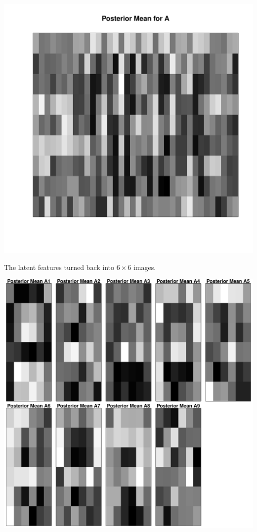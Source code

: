\beginmyfig
  \caption{}
  \includegraphics{images/postA.pdf}
\endmyfig
\beginmyfig
  \caption{The latent features turned back into $6 \times 6$ images.}
  \includegraphics{images/postA66.pdf}
\endmyfig

